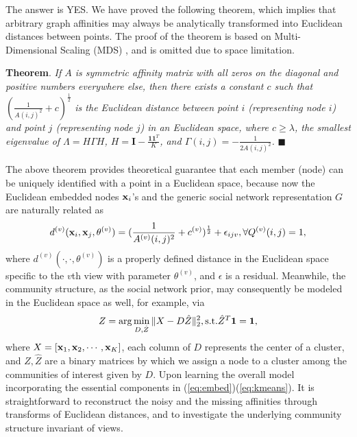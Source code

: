 The answer is YES. We have proved the following theorem, which implies that arbitrary graph affinities may always be analytically transformed into Euclidean distances between points. The proof of the theorem is based on Multi-Dimensional Scaling (MDS) \cite{CoxMDS}, and is omitted due to space limitation.

\vspace{5pt}
\textbf{Theorem}. \textit{If $A$ is symmetric affinity matrix with all zeros on the diagonal and positive numbers everywhere else, then there exists a constant $c$ such that $(\frac{1}{A(i,j)^2}+c)^{\frac{1}{2}}$ is the Euclidean distance between point $i$ (representing node $i$) and point $j$ (representing node $j$) in an Euclidean space, where $c\geq\lambda$, the smallest eigenvalue of $\Lambda=H\Gamma H$, $H=\mathbf{I}-\frac{\mathbf{1}\mathbf{1}^T}{K}$, and $\Gamma(i,j)=-\frac{1}{2A(i,j)^2}$.} $\blacksquare$
\vspace{5pt}


The above theorem provides theoretical guarantee that each member (node) can be uniquely identified with a point in a Euclidean space, because now the Euclidean embedded nodes ${\bf x}_i$'s and the generic social network representation $G$ are naturally related as
\begin{equation}\label{eq:embed}
d^{(v)}({\bf x}_i, {\bf x}_j, \theta^{(v)})=(\frac{1}{A^{(v)}(i,j)^2}+c^{(v)})^{\frac{1}{2}}+\epsilon_{ijv}, \forall Q^{(v)}(i,j)=1,
\end{equation}
where $d^{(v)}(\cdot, \cdot, \theta^{(v)})$ is a properly defined distance in the Euclidean space specific to the $v$th view with parameter $\theta^{(v)}$, and $\epsilon$ is a residual. Meanwhile, the community structure, as the social network prior, may consequently  be modeled in the Euclidean space as well, for example, via
\begin{equation}\label{eq:kmeans}
Z=\arg\min_{D,\hat{Z}}\|X-D\hat{Z}\|^{2}_{2}, \textup{s.t.} \hat{Z}^{T}\mathbf{1}=\mathbf{1},
 \end{equation}
where $X=[{\bf x}_1,{\bf x}_2,\cdots,{\bf x}_K]$, each column of $D$ represents the center of a cluster, and $Z, \hat{Z}$ are a binary matrices by which we assign a node to a cluster among the communities of interest given by $D$. Upon learning the overall model incorporating the essential components in (\ref{eq:embed})(\ref{eq:kmeans}). It is straightforward to reconstruct the noisy and the missing affinities through transforms of Euclidean distances, and to investigate the underlying community structure invariant of views.


